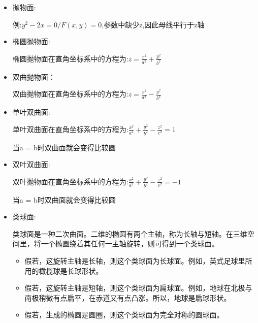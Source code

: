 \documentclass[UTF8]{ctexbook}
\begin{document}
{{{{\begin{itemize}
{\begin{itemize}
{                      点(a,0,0)、(0,b,0)和(0,0,c)都在曲面上。从原点到这三个点的线段,称为椭球的半主轴。它们与椭圆的半长轴和半短轴相对应。

                      体积公式为:$\frac{4}{3}\pi abc$。

                      注意,当三个半径都相等时,这个公式便化为球的体积;两个半径相等时,便化为扁球面或长球面的体积。
                      }
                \item {
                      抛物面:

                      例:$y^2 - 2x = 0 / F(x,y) = 0$,参数中缺少z,因此母线平行于z轴
                      }
                \item {
                      椭圆抛物面:

                      椭圆抛物面在直角坐标系中的方程为:$z = \frac{x^2}{a^2} + \frac{y^2}{b^2}$
                      }
                \item {
                      双曲抛物面：

                      双曲抛物面在直角坐标系中的方程为:$z = \frac{x^2}{a^2} - \frac{y^2}{b^2}$
                      }
                \item {
                      单叶双曲面:

                      单叶双曲面在直角坐标系中的方程为:$\frac{x^2}{a^2} + \frac{y^2}{b^2} - \frac{z^2}{c^2} = 1$

                      当a = b时双曲面就会变得比较圆
                      }
                \item {
                      双叶双曲面:

                      双叶抛物面在直角坐标系中的方程为:$\frac{x^2}{a^2} + \frac{y^2}{b^2} - \frac{z^2}{c^2} = -1$

                      当a = b时双曲面就会变得比较圆
                      }
                \item {
                      类球面:

                      类球面是一种二次曲面。二维的椭圆有两个主轴，称为长轴与短轴。在三维空间里，将一个椭圆绕着其任何一主轴旋转，则可得到一个类球面。

                      \begin{itemize}
                        \item 假若，这旋转主轴是长轴，则这个类球面为长球面。例如，英式足球里所用的橄榄球是长球形状。
                        \item 假若，这旋转主轴是短轴，则这个类球面为扁球面。例如，地球在北极与南极稍微有点扁平，在赤道又有点凸涨。所以，地球是扁球形状。
                        \item  假若，生成的椭圆是圆圈，则这个类球面为完全对称的圆球面。
                      \end{itemize}

}
\end{itemize}}
\end{itemize}}}}}
\end{document}

